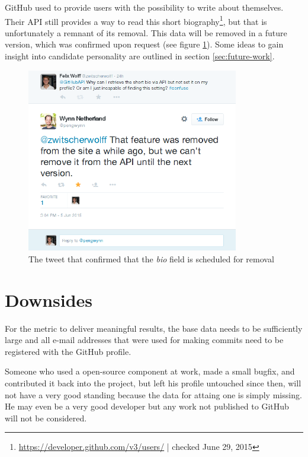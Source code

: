 GitHub used to provide users with the possibility to write about themselves. Their API still provides a way to read this short biography\footnote{\url{https://developer.github.com/v3/users/} | checked June 29, 2015}, but that is unfortunately a remnant of its removal. This data will be removed in a future version, which was confirmed upon request (see figure \ref{fig:gapitweet}). Some ideas to gain insight into candidate personality are outlined in section \ref{sec:future-work}.

\begin{figure}
  \centering
  \includegraphics[width=25em]{gfx/githubapi_tweet.png}
  \caption{The tweet that confirmed that the \textit{bio} field is scheduled for removal}
  \label{fig:gapitweet}
\end{figure}

\section{Downsides}\label{sec:threatstovalidity}
For the metric to deliver meaningful results, the base data
needs to be sufficiently large and all e-mail addresses that were used for
making commits need to be registered with the GitHub profile.

Someone who used a open-source component at work, made a small bugfix,
and contributed it back into the project, but left his profile untouched
since then, will not have a very good standing because the data
for attaing one is simply missing. He may even be a very good developer
but any work not published to GitHub will not be considered.